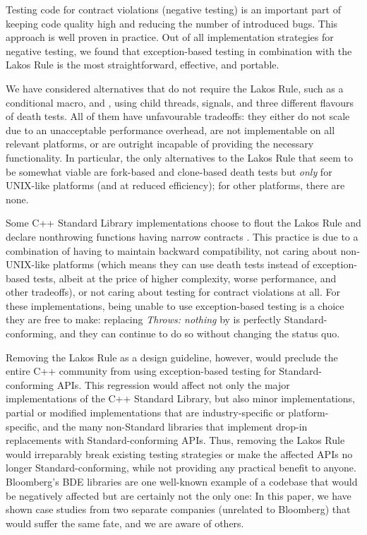 Testing code for contract violations (negative testing) is an important part of keeping code quality high and reducing the number of introduced bugs. This approach is well proven in practice. Out of all implementation strategies for negative testing, we found that exception-based testing in combination with the Lakos Rule is the most straightforward, effective, and portable.

We have considered alternatives that do not require the Lakos Rule, such as a conditional  macro,  and , using child threads, signals, and three different flavours of death tests. All of them have unfavourable tradeoffs: they either do not scale due to an unacceptable performance overhead, are not implementable on all relevant platforms, or are outright incapable of providing the necessary functionality. In particular, the only alternatives to the Lakos Rule that seem to be somewhat viable are fork-based and clone-based death tests but \emph{only} for UNIX-like platforms (and at reduced efficiency); for other platforms, there are none.

Some C++ Standard Library implementations choose to flout the Lakos Rule and declare nonthrowing functions having narrow contracts . This practice is due to a combination of having to maintain backward compatibility, not caring about non-UNIX-like platforms (which means they can use death tests instead of exception-based tests, albeit at the price of higher complexity, worse performance, and other tradeoffs), or not caring about testing for contract violations at all. For these implementations, being unable to use exception-based testing is a choice they are free to make: replacing \emph{Throws: nothing} by  is perfectly Standard-conforming, and they can continue to do so without changing the status quo.

Removing the Lakos Rule as a design guideline, however, would preclude the entire C++ community from using exception-based testing for Standard-conforming APIs. This regression would affect not only the major implementations of the C++ Standard Library, but also minor implementations, partial or modified implementations that are industry-specific or platform-specific, and the many non-Standard libraries that implement drop-in replacements with Standard-conforming APIs. Thus, removing the Lakos Rule would irreparably break existing testing strategies or make the affected APIs no longer Standard-conforming, while not providing any practical benefit to anyone. Bloomberg's BDE libraries are one well-known example of a codebase that would be negatively affected but are certainly not the only one: In this paper, we have shown case studies from two separate companies (unrelated to Bloomberg) that would suffer the same fate, and we are aware of others.


